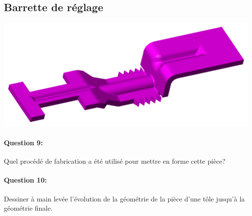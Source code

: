 \vspace{5cm}

\subsection{Barrette de réglage}


 \begin{minipage}{0.3\linewidth}
 \centering\includegraphics[width=1\linewidth]{img/barrette_reglage.png}
 \end{minipage}
 \hfill
 \begin{minipage}{0.65\linewidth}
 \paragraph{Question 9:} Quel procédé de fabrication a été utilisé pour mettre en forme cette pièce?

 \end{minipage}

\paragraph{Question 10:} Dessiner à main levée l'évolution de la géométrie de la pièce d'une tôle jusqu'à la géométrie finale.

\vspace{5cm}




